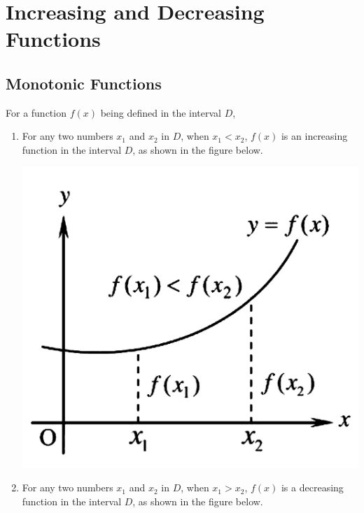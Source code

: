 \documentclass{report}
\begin{document}
\newpage

\section{Increasing and Decreasing Functions}

\subsection*{Monotonic Functions}

For a function $f(x)$ being defined in the interval $D$,
\begin{enumerate}
    \item For any two numbers $x_1$ and $x_2$ in $D$, when $x_1 < x_2$, $f(x)$ is an
          increasing function in the interval $D$, as shown in the figure below.
          \begin{center}
              \includegraphics[scale=0.25]{assets/26-2.png}
          \end{center}
    \item For any two numbers $x_1$ and $x_2$ in $D$, when $x_1 > x_2$, $f(x)$ is a
          decreasing function in the interval $D$, as shown in the figure below.
          \begin{center}

\end{center}
\end{enumerate}
\end{document}
